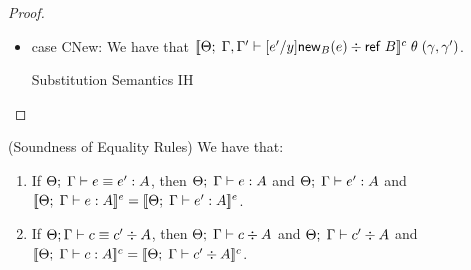 \begin{proof}
\begin{itemize}
\item case CNew: We have that $[\![{{\Theta};\;{\Gamma,\Gamma'} \vdash {[e'/y]\mathsf{new}_{B}(e)} \div {\mathsf{ref}\;B}}]\!]^c
                                       \;\theta\;(\gamma,\gamma')$.
  \begin{eqnproof}
          {Substitution}
          {}
           {Semantics}
          {}
           {IH}
  \end{eqnproof}

    
\end{itemize}
\end{proof}



\begin{lemma}{(Soundness of Equality Rules)}
We have that:
\begin{enumerate}
\item If ${\Theta};\;{\Gamma} \vdash {e} \equiv {e'} : {A}$, then ${\Theta};\;{\Gamma} \vdash {e} : {A}$ and 
${\Theta};\;{\Gamma} \vdash {e'} : {A}$ and 
$[\![{{\Theta};\;{\Gamma} \vdash {e} : {A}}]\!]^e = [\![{{\Theta};\;{\Gamma} \vdash {e'} : {A}}]\!]^e$.

\item If ${\Theta};{\Gamma} \vdash {c} \equiv {c'} \div {A}$, then ${\Theta};\;{\Gamma} \vdash {c} \div {A}$ and 
${\Theta};\;{\Gamma} \vdash {c'} \div {A}$ and 
$[\![{{\Theta};\;{\Gamma} \vdash {c} : {A}}]\!]^c = [\![{{\Theta};\;{\Gamma} \vdash {c'} \div {A}}]\!]^c$.
\end{enumerate}
\end{lemma}


